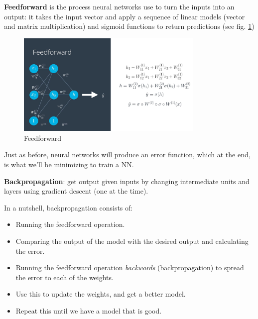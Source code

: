\documentclass[11pt]{article}
\begin{document}
\textbf{Feedforward} is the process neural networks use to turn the inputs into an output: it takes the input vector and apply a sequence of linear models (vector and matrix multiplication) and sigmoid functions to return predictions (see fig. \ref{feedforward})
\begin{figure}[htbp] 
	\centering
	\includegraphics[width=0.8\textwidth]{pics/feedforward}
	\caption{Feedforward} 
	\label{feedforward}
\end{figure}

Just as before, neural networks will produce an error function, which at the end, is what we'll be minimizing to train a NN.

\textbf{Backpropagation}: get output given inputs by changing intermediate units and layers using gradient descent (one at the time).

In a nutshell, backpropagation consists of:
\begin{itemize}
	\item Running the feedforward operation.
	\item Comparing the output of the model with the desired output and calculating the error.
	\item Running the feedforward operation \textit{backwards} (backpropagation) to spread the error to each of the weights.
	\item Use this to update the weights, and get a better model.
	\item Repeat this until we have a model that is good.
\end{itemize}
\end{document}
